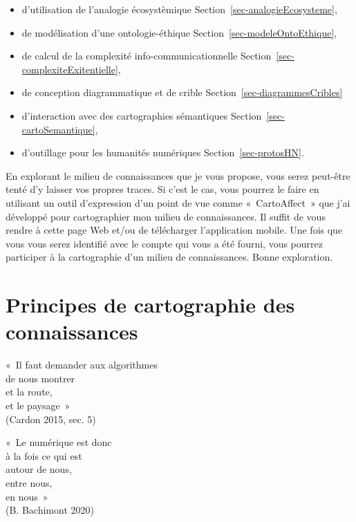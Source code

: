 \documentclass[
  letterpaper,
  DIV=11,
  numbers=noendperiod]{scrreprt}
\providecommand{\tightlist}{%
  \setlength{\itemsep}{0pt}\setlength{\parskip}{0pt}}\usepackage{longtable,booktabs,array}
\begin{document}
\begin{itemize}
\tightlist
\item
  d'utilisation de l'analogie écosystèmique
  Section~\ref{sec-analogieEcosysteme},
\item
  de modélisation d'une ontologie-éthique
  Section~\ref{sec-modeleOntoEthique},
\item
  de calcul de la complexité info-communicationnelle
  Section~\ref{sec-complexiteExitentielle},
\item
  de conception diagrammatique et de crible
  Section~\ref{sec-diagrammesCribles}
\item
  d'interaction avec des cartographies sémantiques
  Section~\ref{sec-cartoSemantique},
\item
  d'outillage pour les humanités numériques Section~\ref{sec-protosHN}.
\end{itemize}

En explorant le milieu de connaissances que je vous propose, vous serez
peut-être tenté d'y laisser vos propres traces. Si c'est le cas, vous
pourrez le faire en utilisant un outil d'expression d'un point de vue
comme «~CartoAffect~» que j'ai développé pour cartographier mon milieu
de connaissances. Il suffit de vous rendre à cette page Web et/ou de
télécharger l'application mobile. Une fois que vous vous serez identifié
avec le compte qui vous a été fourni, vous pourrez participer à la
cartographie d'un milieu de connaissances. Bonne exploration.

\hypertarget{sec-principesCarto}{%
\chapter{Principes de cartographie des
connaissances}\label{sec-principesCarto}}

\leavevmode{}%
«~Il faut demander aux algorithmes\\
de nous montrer\\
et la route,\\
et le paysage~»\\
(Cardon 2015, sec. 5)

\leavevmode{}%
«~Le numérique est donc\\
à la fois ce qui est\\
autour de nous,\\
entre nous,\\
en nous~»\\
(B. Bachimont 2020)
\end{document}
